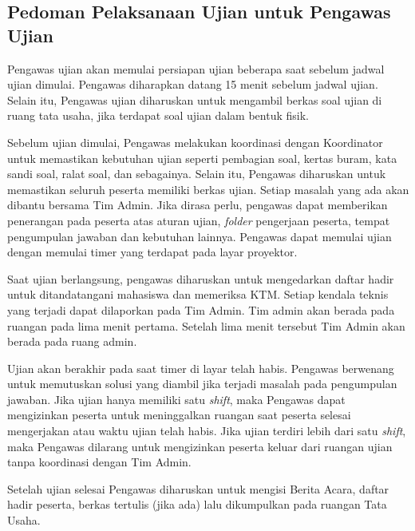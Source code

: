 \subsection{Pedoman Pelaksanaan Ujian untuk Pengawas Ujian}
    Pengawas ujian akan memulai persiapan ujian beberapa saat sebelum jadwal ujian
    dimulai. Pengawas diharapkan datang 15 menit sebelum jadwal ujian. Selain
    itu, Pengawas ujian diharuskan untuk mengambil berkas soal ujian di ruang
    tata usaha, jika terdapat soal ujian dalam bentuk fisik.

    Sebelum ujian dimulai, Pengawas melakukan koordinasi dengan Koordinator
    untuk memastikan kebutuhan ujian seperti pembagian soal, kertas buram, kata
    sandi soal, ralat soal, dan sebagainya. Selain itu, Pengawas diharuskan
    untuk memastikan seluruh peserta memiliki berkas ujian. Setiap masalah yang
    ada akan dibantu bersama Tim Admin. Jika dirasa perlu, pengawas dapat
    memberikan penerangan pada peserta atas aturan ujian, \textit{folder} pengerjaan
    peserta, tempat pengumpulan jawaban dan kebutuhan lainnya. Pengawas dapat
    memulai ujian dengan memulai timer yang terdapat pada layar proyektor.

    Saat ujian berlangsung, pengawas diharuskan untuk mengedarkan daftar hadir
    untuk ditandatangani mahasiswa dan memeriksa KTM. Setiap kendala teknis yang
    terjadi dapat dilaporkan pada Tim Admin. Tim admin akan berada pada ruangan
    pada lima menit pertama. Setelah lima menit tersebut Tim Admin akan berada
    pada ruang admin. 
    
    Ujian akan berakhir pada saat timer di layar telah habis. Pengawas berwenang
    untuk memutuskan solusi yang diambil jika terjadi masalah pada pengumpulan
    jawaban. Jika ujian hanya memiliki satu \textit{shift}, maka Pengawas dapat
    mengizinkan peserta untuk meninggalkan ruangan saat peserta selesai
    mengerjakan atau waktu ujian telah habis. Jika ujian terdiri lebih dari satu
    \textit{shift}, maka Pengawas dilarang untuk mengizinkan peserta keluar dari
    ruangan ujian tanpa koordinasi dengan Tim Admin.

    Setelah ujian selesai Pengawas diharuskan untuk mengisi Berita Acara, daftar
    hadir peserta, berkas tertulis (jika ada) lalu dikumpulkan pada ruangan Tata
    Usaha.
    
